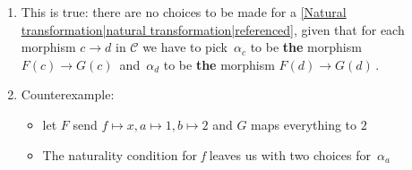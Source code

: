 \begin{enumerate}
    \item   This is true: there are no choices to be made for a \ref{Natural transformation|natural transformation|referenced}, given that for each morphism $c\rightarrow d$ in $\mathcal{C}$ we have to pick \,$\alpha_c$ to be \textbf{the} morphism $F(c)\rightarrow G(c)$\, and \,$\alpha_{d}$ to be \textbf{the} morphism $F(d)\rightarrow G(d)$\,.
    \item Counterexample: 
          \begin{itemize}
            \item let $F$ send $f\mapsto x,a\mapsto1,b\mapsto 2$ and $G$ maps everything to $2$
            \item The naturality condition for \emph{f} leaves us with two choices for \,$\alpha_a$

                  \,
          \end{itemize}

  \end{enumerate}
